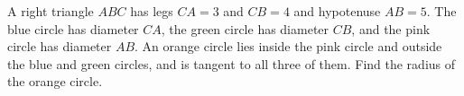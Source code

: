 A right triangle $ABC$ has legs $CA=3$ and $CB=4$ and hypotenuse $AB=5$. The blue circle has diameter $CA$, the green circle has diameter $CB$, and the pink circle has diameter $AB$. An orange circle lies inside the pink circle and outside the blue and green circles, and is tangent to all three of them. Find the radius of the orange circle.
